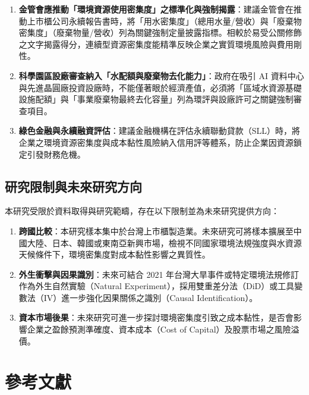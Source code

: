 \documentclass[12pt,a4paper]{article}
\begin{document}
\begin{enumerate}[leftmargin=*]
    \item \textbf{金管會應推動「環境資源使用密集度」之標準化與強制揭露}：建議金管會在推動上市櫃公司永續報告書時，將「用水密集度」（總用水量/營收）與「廢棄物密集度」（廢棄物量/營收）列為關鍵強制定量披露指標。相較於易受公關修飾之文字揭露得分，連續型資源密集度能精準反映企業之實質環境風險與費用剛性。
    \item \textbf{科學園區設廠審查納入「水配額與廢棄物去化能力」}：政府在吸引 AI 資料中心與先進晶圓廠投資設廠時，不能僅著眼於經濟產值，必須將「區域水資源基礎設施配額」與「事業廢棄物最終去化容量」列為環評與設廠許可之關鍵強制審查項目。
    \item \textbf{綠色金融與永續融資評估}：建議金融機構在評估永續聯動貸款（SLL）時，將企業之環境資源密集度與成本黏性風險納入信用評等體系，防止企業因資源鎖定引發財務危機。
\end{enumerate}

\subsection{研究限制與未來研究方向}

本研究受限於資料取得與研究範疇，存在以下限制並為未來研究提供方向：
\begin{enumerate}[leftmargin=*]
    \item \textbf{跨國比較}：本研究樣本集中於台灣上市櫃製造業。未來研究可將樣本擴展至中國大陸、日本、韓國或東南亞新興市場，檢視不同國家環境法規強度與水資源天候條件下，環境密集度對成本黏性影響之異質性。
    \item \textbf{外生衝擊與因果識別}：未來可結合 2021 年台灣大旱事件或特定環境法規修訂作為外生自然實驗（Natural Experiment），採用雙重差分法（DiD）或工具變數法（IV）進一步強化因果關係之識別（Causal Identification）。
    \item \textbf{資本市場後果}：未來研究可進一步探討環境密集度引致之成本黏性，是否會影響企業之盈餘預測準確度、資本成本（Cost of Capital）及股票市場之風險溢價。
\end{enumerate}

\newpage

\section*{參考文獻}
\end{document}
